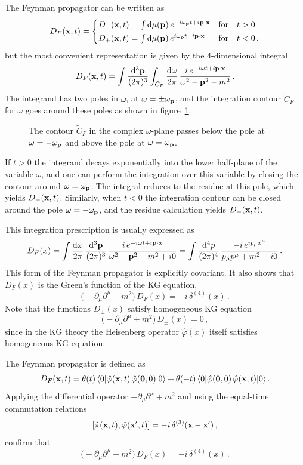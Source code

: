The Feynman propagator can be written as
\[
D_F(\mathbf{x},t)=
\begin{cases}
D_-(\mathbf{x},t)=\int \mathop{}\!\mathrm{d}\mu(\mathbf{p})\,e^{-i\omega_{\mathbf{p}} t+i\mathbf{p}\cdot\mathbf{x}} & \text{for}\quad t>0\\[2pt]
D_+(\mathbf{x},t)=\int \mathop{}\!\mathrm{d}\mu(\mathbf{p})\,e^{i\omega_{\mathbf{p}} t-i\mathbf{p}\cdot\mathbf{x}} & \text{for}\quad t<0\,,
\end{cases}
\]
but the most convenient representation is given by the 4-dimensional integral
\[
D_F(\mathbf{x},t)=\int\frac{\mathop{}\!\mathrm{d}^3\mathbf{p}}{(2\pi)^3}\int_{\tilde C_F}\frac{\mathop{}\!\mathrm{d}\omega}{2\pi}\,
\frac{i\,e^{-i\omega t+i\mathbf{p}\cdot\mathbf{x}}}{\omega^2-\mathbf{p}^2-m^2}\,.
\]
The integrand has two poles in $\omega$, at $\omega=\pm\omega_{\mathbf{p}}$, and the
integration contour $\tilde C_F$ for $\omega$ goes around these poles as shown
in figure~\ref{fig:omegaF}.
\begin{figure}[ht]
\centering{}
\caption{The contour $\tilde C_F$ in the complex $\omega$-plane passes below
the pole at $\omega=-\omega_{\mathbf{p}}$ and above the pole at $\omega=\omega_{\mathbf{p}}$.}
\label{fig:omegaF}
\end{figure}

If $t>0$ the integrand decays exponentially into the lower half-plane of the
variable $\omega$, and one can perform the integration over this variable by
closing the contour around $\omega=\omega_{\mathbf{p}}$. The integral reduces to the
residue at this pole, which yields $D_-(\mathbf{x},t)$. Similarly, when $t<0$ the
integration contour can be closed around the pole $\omega=-\omega_{\mathbf{p}}$, and the
residue calculation yields $D_+(\mathbf{x},t)$.

This integration prescription is usually expressed as
\[
D_F(x)=\int\frac{\mathop{}\!\mathrm{d}\omega}{2\pi}\,\frac{\mathop{}\!\mathrm{d}^3\mathbf{p}}{(2\pi)^3}\,\frac{i\,e^{-i\omega t+i\mathbf{p}\cdot\mathbf{x}}}{\omega^2-\mathbf{p}^2-m^2+i0}
=\int\frac{\mathop{}\!\mathrm{d}^4p}{(2\pi)^4}\,\frac{-i\,e^{ip_\mu x^\mu}}{p_\mu p^\mu+m^2-i0}\,.
\]
This form of the Feynman propagator is explicitly covariant. It also shows that
$D_F(x)$ is the Green's function of the KG equation,
\[
\bigl(-\partial_\mu\partial^\mu+m^2\bigr)\,D_F(x)=-i\,\delta^{(4)}(x)\,.
\]
Note that the functions $D_\pm(x)$ satisfy homogeneous KG equation
\[
\bigl(-\partial_\mu\partial^\mu+m^2\bigr)\,D_\pm(x)=0\,,
\]
since in the KG theory the Heisenberg operator $\hat\varphi(x)$ itself
satisfies homogeneous KG equation.

\begin{exercise}
The Feynman propagator is defined as
\[
D_F(\mathbf{x},t)=\theta(t)\,\langle 0|\hat\varphi(\mathbf{x},t)\,\hat\varphi(\mathbf0,0)|0\rangle+\theta(-t)\,\langle 0|\hat\varphi(\mathbf0,0)\,\hat\varphi(\mathbf{x},t)|0\rangle\,.
\]
Applying the differential operator $-\partial_\mu\partial^\mu+m^2$ and using the
equal-time commutation relations
\[
[\hat\pi(\mathbf{x},t),\hat\varphi(\mathbf{x}',t)]=-i\,\delta^{(3)}(\mathbf{x}-\mathbf{x}')\,,
\]
confirm that
\[
\bigl(-\partial_\mu\partial^\mu+m^2\bigr)\,D_F(x)=-i\,\delta^{(4)}(x)\,.
\]
\end{exercise}

